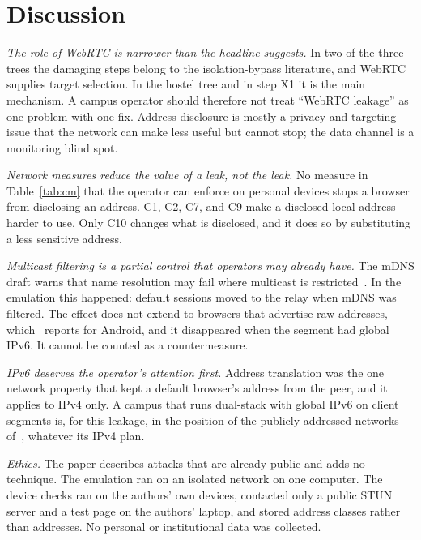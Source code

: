 \documentclass[conference]{IEEEtran}
\begin{document}
\section{Discussion}
\label{sec:discussion}
\textit{The role of WebRTC is narrower than the headline suggests.} In two of the three trees the damaging steps belong to the isolation-bypass literature, and WebRTC supplies target selection. In the hostel tree and in step X1 it is the main mechanism. A campus operator should therefore not treat ``WebRTC leakage'' as one problem with one fix. Address disclosure is mostly a privacy and targeting issue that the network can make less useful but cannot stop; the data channel is a monitoring blind spot.

\textit{Network measures reduce the value of a leak, not the leak.} No measure in Table~\ref{tab:cm} that the operator can enforce on personal devices stops a browser from disclosing an address. C1, C2, C7, and C9 make a disclosed local address harder to use. Only C10 changes what is disclosed, and it does so by substituting a less sensitive address.

\textit{Multicast filtering is a partial control that operators may already have.} The mDNS draft warns that name resolution may fail where multicast is restricted~\cite{mdnsdraft}. In the emulation this happened: default sessions moved to the relay when mDNS was filtered. The effect does not extend to browsers that advertise raw addresses, which~\cite{koysha2025} reports for Android, and it disappeared when the segment had global IPv6. It cannot be counted as a countermeasure.

\textit{IPv6 deserves the operator's attention first.} Address translation was the one network property that kept a default browser's address from the peer, and it applies to IPv4 only. A campus that runs dual-stack with global IPv6 on client segments is, for this leakage, in the position of the publicly addressed networks of~\cite{nibert2025}, whatever its IPv4 plan.

\textit{Ethics.} The paper describes attacks that are already public and adds no technique. The emulation ran on an isolated network on one computer. The device checks ran on the authors' own devices, contacted only a public STUN server and a test page on the authors' laptop, and stored address classes rather than addresses. No personal or institutional data was collected.
\end{document}
